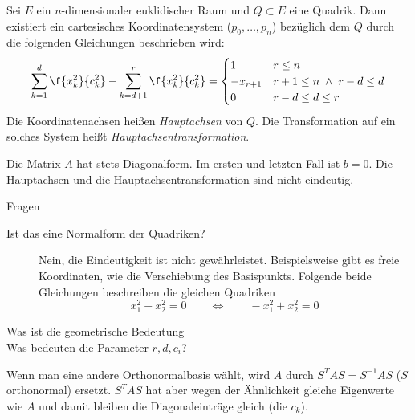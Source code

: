 \documentclass{mycourse}
\begin{document}
\begin{thm}
	\label{thm:14.3}
	Sei $E$ ein $n$-dimensionaler euklidischer Raum und $Q\subset E$ eine Quadrik.
	Dann existiert ein cartesisches Koordinatensystem ($p_0,\dotsc, p_n$) bezüglich dem $Q$ durch die folgenden Gleichungen beschrieben wird:
	\begin{align*}
	\sum_{k=1}^d\f{x_k^2}{c_k^2} - \sum_{k=d+1}^r \f{x_{k}^2}{c_k^2} = \begin{cases}
		1 & r \le n\\
		-x_{r+1} & r+1 \le n \;\land\; r-d \le d\\
		0 & r-d \le d \le r
	\end{cases}
	\end{align*}
	Die Koordinatenachsen heißen \emph{Hauptachsen} von $Q$.
	Die Transformation auf ein solches System heißt \emph{Hauptachsentransformation}.
	\begin{note}
		Die Matrix $A$ hat stets Diagonalform.
		Im ersten und letzten Fall ist $b=0$. 
		Die Hauptachsen und die Hauptachsentransformation sind nicht eindeutig.
	\end{note}
\end{thm}

\begin{seg}{Fragen}
	\begin{description}
		\item[Ist das eine Normalform der Quadriken?]
			Nein, die Eindeutigkeit ist nicht gewährleistet.
			Beispielsweise gibt es freie Koordinaten, wie die Verschiebung des Basispunkts.
			Folgende beide Gleichungen beschreiben die gleichen Quadriken
			\[
				x_1^2 - x_2^2 = 0 \qquad \iff  \qquad -x_1^2 + x_2^2 = 0
			\]
		\item[Was ist die geometrische Bedeutung]

		\item[Was bedeuten die Parameter $r,d,c_i$?]
	\end{description}
\end{seg}

Wenn man eine andere Orthonormalbasis wählt, wird $A$ durch $S^TAS = S^{-1}AS$ ($S$ orthonormal) ersetzt.
$S^TAS$ hat aber wegen der Ähnlichkeit gleiche Eigenwerte wie $A$ und damit bleiben die Diagonaleinträge gleich (die $c_k$).
\end{document}
